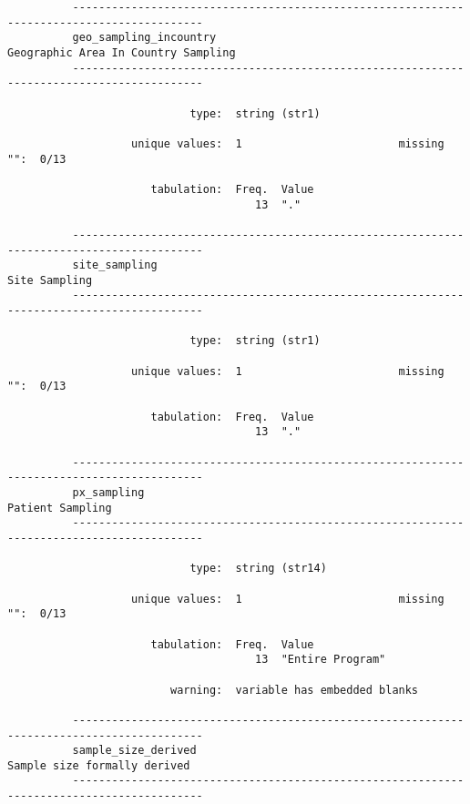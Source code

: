 \documentclass{article}
\begin{document}
\begin{verbatim}
          ------------------------------------------------------------------------------------------
          geo_sampling_incountry                                 Geographic Area In Country Sampling
          ------------------------------------------------------------------------------------------
          
                            type:  string (str1)
          
                   unique values:  1                        missing "":  0/13
          
                      tabulation:  Freq.  Value
                                      13  "."
          
          ------------------------------------------------------------------------------------------
          site_sampling                                                                Site Sampling
          ------------------------------------------------------------------------------------------
          
                            type:  string (str1)
          
                   unique values:  1                        missing "":  0/13
          
                      tabulation:  Freq.  Value
                                      13  "."
          
          ------------------------------------------------------------------------------------------
          px_sampling                                                               Patient Sampling
          ------------------------------------------------------------------------------------------
          
                            type:  string (str14)
          
                   unique values:  1                        missing "":  0/13
          
                      tabulation:  Freq.  Value
                                      13  "Entire Program"
          
                         warning:  variable has embedded blanks
          
          ------------------------------------------------------------------------------------------
          sample_size_derived                                           Sample size formally derived
          ------------------------------------------------------------------------------------------
          

\end{verbatim}
\end{document}
